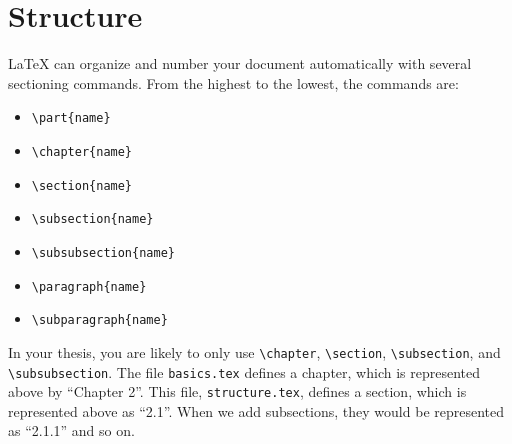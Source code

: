 
\section{Structure}%
\label{sec:basics-structure}%

\LaTeX{} can organize and number your document automatically with several sectioning commands.
From the highest to the lowest, the commands are:

\begin{itemize}[noitemsep,left=1pt]
  \item \verb|\part{name}|
  \item \verb|\chapter{name}|
  \item \verb|\section{name}|
  \item \verb|\subsection{name}|
  \item \verb|\subsubsection{name}|
  \item \verb|\paragraph{name}|
  \item \verb|\subparagraph{name}|
\end{itemize}

\noindent In your thesis, you are likely to only use \verb|\chapter|, \verb|\section|, \verb|\subsection|, and \verb|\subsubsection|.
The file \verb|basics.tex| defines a chapter, which is represented above by ``Chapter 2''.
This file, \verb|structure.tex|, defines a section, which is represented above as ``2.1''.
When we add subsections, they would be represented as ``2.1.1'' and so on.

